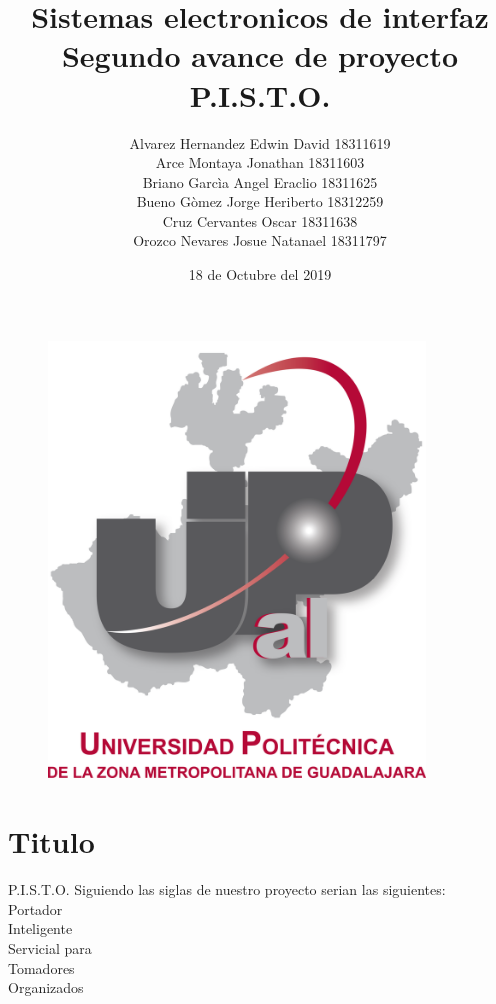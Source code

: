\documentclass[12pt,a4paper]{report}
\begin{document}
\title{\textbf{Sistemas electronicos de interfaz\\Segundo avance de proyecto\\P.I.S.T.O.}}
\author{Alvarez Hernandez Edwin David 18311619\\Arce Montaya Jonathan 18311603\\Briano Garcìa Angel Eraclio 18311625\\Bueno Gòmez Jorge Heriberto 18312259\\Cruz Cervantes Oscar 18311638\\Orozco Nevares Josue Natanael 18311797}
\date{18 de Octubre del 2019}

\begin{figure}
\centering
\includegraphics[width=10cm]{UPCDLZMDG5783-logo.png} 
\end{figure}
\maketitle


\section{Titulo}

P.I.S.T.O. Siguiendo las siglas de nuestro proyecto serian las siguientes:\\
Portador\\
Inteligente\\
Servicial para\\
Tomadores\\
Organizados\\
\end{document}
